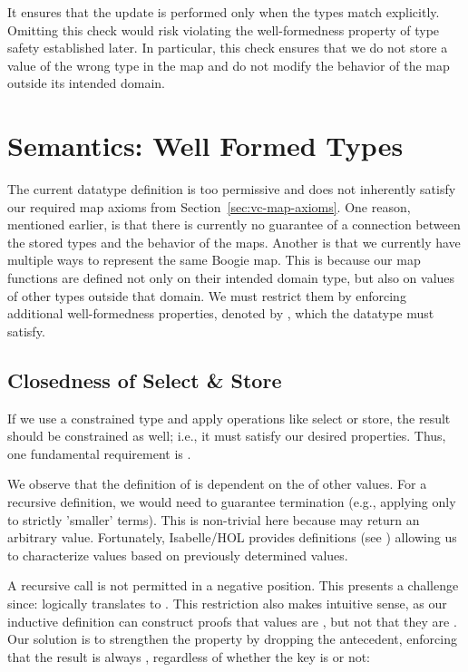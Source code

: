 It ensures that the update is performed only when the types match explicitly.
Omitting this check would risk violating the well-formedness property of type safety established later.
In particular, this check ensures that we do not store a value of the wrong type in the map
and do not modify the behavior of the map outside its intended domain.


\section{Semantics: Well Formed Types}

The current datatype definition is too permissive
and does not inherently satisfy our required map axioms from Section~\ref{sec:vc-map-axioms}.
One reason, mentioned earlier, is that there is currently no guarantee
of a connection between the stored types and the behavior of the maps.
Another is that we currently have multiple ways to represent the same Boogie map.
This is because our map functions are defined not only on their intended domain type,
but also on values of other types outside that domain.
We must restrict them by enforcing additional well-formedness properties, denoted by ,
which the datatype must satisfy.


\subsection{Closedness of Select \& Store}
\label{sec:closed}

If we use a constrained type and apply operations like select or store,
the result should be constrained as well; i.e., it must satisfy our desired properties.
Thus, one fundamental requirement is .

We observe that the definition of  is dependent on the  of other values.
For a recursive definition, we would need to guarantee termination
(e.g., applying  only to strictly 'smaller' terms).
This is non-trivial here because  may return an arbitrary value.
Fortunately, Isabelle/HOL provides  definitions (see )
allowing us to characterize  values based on previously determined  values.

A recursive  call is not permitted in a negative position. This presents a challenge since:
logically translates to
.
This restriction also makes intuitive sense, as our inductive definition can construct proofs that values are ,
but not that they are .
Our solution is to strengthen the property by dropping the antecedent,
enforcing that the result is always , regardless of whether the key is  or not:


